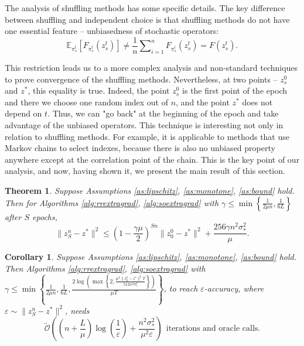 \documentclass{article}
\newtheorem{theorem}{Theorem}
\newtheorem{corollary}{Corollary}
\begin{document}
The analysis of shuffling methods has some specific details. The key difference between shuffling and independent choice is that shuffling methods do not have one essential feature -- unbiasedness of stochastic operators:
\begin{equation*}
    \mathbb E_{\pi_s^t} \left[F_{\pi_s^t}(z_s^t)\right] \neq \frac{1}{n}\sum\nolimits_{i = 1}^n F_{\pi_s^i}(z_s^t) = F(z_s^t).
\end{equation*}

\vspace{-2mm}
This restriction leads us to a more complex analysis and non-standard techniques to prove convergence of the shuffling methods. Nevertheless, at two points -- $z_s^0$ and $z^*$, this equality is true. Indeed, the point $z_s^0$ is the first point of the epoch and there we choose one random index out of $n$, and the point $z^*$ does not depend on $t$. Thus, we can "go back" at the beginning of the epoch and take advantage of the unbiased operators. This technique is interesting not only in relation to shuffling methods. For example, it is applicable to methods that use Markov chains to select indexes, because there is also no unbiased property anywhere except at the correlation point of the chain. This is the key point of our analysis, and now, having shown it, we present the main result of this section.

\begin{theorem}\label{th:eg}
    Suppose Assumptions \ref{as:lipschitz}, \ref{as:monotone}, \ref{as:bound} hold. Then for Algorithms \ref{alg:rrextragrad}, \ref{alg:soextragrad} with $\gamma\leqslant\min\left\{\frac{1}{2\mu n}, \frac{1}{6L}\right\}$ after $S$ epochs,
    \vspace{-2mm}
    \begin{equation*}
        \|z_S^n - z^*\|^2 \leqslant (1 - \frac{\gamma\mu}{2})^{Sn} \|z^0_0 - z^*\|^2 +  \frac{256\gamma n^2\sigma^2_*}{\mu}.
    \end{equation*}
\end{theorem}

\begin{corollary}\label{cor:eg}
    Suppose Assumptions \ref{as:lipschitz}, \ref{as:monotone}, \ref{as:bound} hold. Then Algorithms \ref{alg:rrextragrad}, \ref{alg:soextragrad} with $\gamma \leqslant \min\left\{\frac{1}{2\mu n}, \frac{1}{6L}, \frac{2\log\left(\max\left\{2, \frac{\mu^2\|z_0^0 - z^*\|^2 T}{512 n^2\sigma^2_*}\right\}\right)}{\mu T}\right\}$, to reach $\varepsilon$-accuracy, where $\varepsilon \sim \|z_S^n - z^*\|^2$, needs
    \begin{equation*}
    \mathcal{\widetilde{O}}\left(\left(n + \frac{L}{\mu}\right)\log\left(\frac{1}{\varepsilon}\right) + \frac{n^2\sigma^2_*}{\mu^2\varepsilon}\right) ~~\text{iterations and oracle calls.}
    \end{equation*}
\end{corollary}
\end{document}
